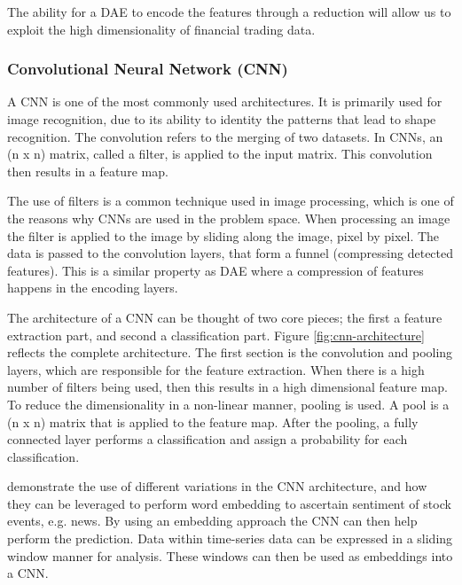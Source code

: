 \documentclass[11pt]{article}
\begin{document}
The ability for a DAE to encode the features through a reduction will allow us to exploit the high dimensionality of financial trading data.

\subsubsection{Convolutional Neural Network (CNN)} \label{sec:cnn}

A CNN is one of the most commonly used architectures. It is primarily used for image recognition, due to its ability to identity the patterns that lead to shape recognition. The convolution refers to the merging of two datasets. In CNNs, an (n x n) matrix, called a filter, is applied to the input matrix. This convolution then results in a feature map.

The use of filters is a common technique used in image processing, which is one of the reasons why CNNs are used in the problem space. When processing an image the filter is applied to the image by sliding along the image, pixel by pixel. The data is passed to the convolution layers, that form a funnel (compressing detected features). This is a similar property as DAE where a compression of features happens in the encoding layers.

The architecture of a CNN can be thought of two core pieces; the first a feature extraction part, and second a classification part. Figure \ref{fig:cnn-architecture} reflects the complete architecture. The first section is the convolution and pooling layers, which are responsible for the feature extraction. When there is a high number of filters being used, then this results in a high dimensional feature map. To reduce the dimensionality in a non-linear manner, pooling is used. A pool is a (n x n) matrix that is applied to the feature map. After the pooling, a fully connected layer performs a classification and assign a probability for each classification.

\citet{Ding2015} demonstrate the use of different variations in the CNN architecture, and how they can be leveraged to perform word embedding to ascertain sentiment of stock events, e.g. news. By using an embedding approach the CNN can then help perform the prediction. Data within time-series data can be expressed in a sliding window manner for analysis. These windows can then be used as embeddings into a CNN.
\end{document}
